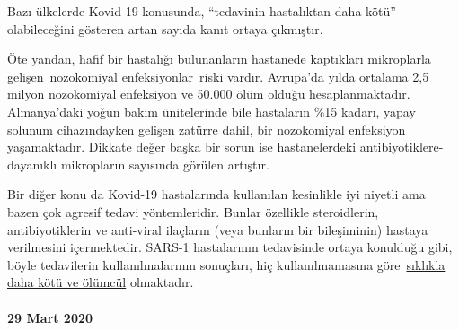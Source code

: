 Bazı ülkelerde Kovid-19 konusunda, ``tedavinin hastalıktan daha kötü''
olabileceğini gösteren artan sayıda kanıt ortaya çıkmıştır.

Öte yandan, hafif bir hastalığı bulunanların hastanede kaptıkları
mikroplarla
gelişen~\href{https://en.wikipedia.org/wiki/Hospital-acquired_infection}{nozokomiyal
enfeksiyonlar}~riski vardır. Avrupa'da yılda ortalama 2,5 milyon
nozokomiyal enfeksiyon ve 50.000 ölüm olduğu hesaplanmaktadır.
Almanya'daki yoğun bakım ünitelerinde bile hastaların \%15 kadarı, yapay
solunum cihazındayken gelişen zatürre dahil, bir nozokomiyal enfeksiyon
yaşamaktadır. Dikkate değer başka bir sorun ise hastanelerdeki
antibiyotiklere-dayanıklı mikropların sayısında görülen artıştır.

Bir diğer konu da Kovid-19 hastalarında kullanılan kesinlikle iyi
niyetli ama bazen çok agresif tedavi yöntemleridir. Bunlar özellikle
steroidlerin, antibiyotiklerin ve anti-viral ilaçların (veya bunların
bir bileşiminin) hastaya verilmesini içermektedir. SARS-1 hastalarının
tedavisinde ortaya konulduğu gibi, böyle tedavilerin kullanılmalarının
sonuçları, hiç kullanılmamasına
göre~\href{https://www.sciencedaily.com/releases/2020/02/200206110703.htm}{sıklıkla
daha kötü ve ölümcül} olmaktadır.

\hypertarget{29-mart-2020}{%
\paragraph{29 Mart 2020}\label{29-mart-2020}}

